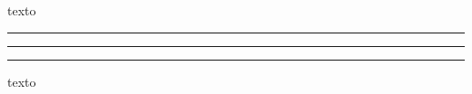 \documentclass[a4paper,12pt]{article}
\begin{document}
	\Huge

	texto \rule[+1ex]{1ex}{1ex}
	      \rule[+0ex]{1ex}{1ex}
	      \rule[-1ex]{1ex}{1ex} texto
	
\end{document}
